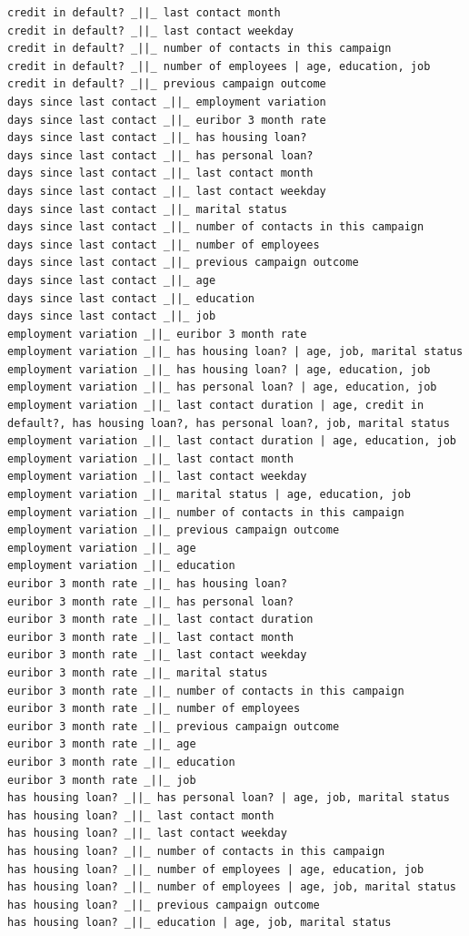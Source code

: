 \documentclass[11pt,]{article}
\begin{document}
{\begin{verbatim}
credit in default? _||_ last contact month
credit in default? _||_ last contact weekday
credit in default? _||_ number of contacts in this campaign
credit in default? _||_ number of employees | age, education, job
credit in default? _||_ previous campaign outcome
days since last contact _||_ employment variation
days since last contact _||_ euribor 3 month rate
days since last contact _||_ has housing loan?
days since last contact _||_ has personal loan?
days since last contact _||_ last contact month
days since last contact _||_ last contact weekday
days since last contact _||_ marital status
days since last contact _||_ number of contacts in this campaign
days since last contact _||_ number of employees
days since last contact _||_ previous campaign outcome
days since last contact _||_ age
days since last contact _||_ education
days since last contact _||_ job
employment variation _||_ euribor 3 month rate
employment variation _||_ has housing loan? | age, job, marital status
employment variation _||_ has housing loan? | age, education, job
employment variation _||_ has personal loan? | age, education, job
employment variation _||_ last contact duration | age, credit in default?, has housing loan?, has personal loan?, job, marital status
employment variation _||_ last contact duration | age, education, job
employment variation _||_ last contact month
employment variation _||_ last contact weekday
employment variation _||_ marital status | age, education, job
employment variation _||_ number of contacts in this campaign
employment variation _||_ previous campaign outcome
employment variation _||_ age
employment variation _||_ education
euribor 3 month rate _||_ has housing loan?
euribor 3 month rate _||_ has personal loan?
euribor 3 month rate _||_ last contact duration
euribor 3 month rate _||_ last contact month
euribor 3 month rate _||_ last contact weekday
euribor 3 month rate _||_ marital status
euribor 3 month rate _||_ number of contacts in this campaign
euribor 3 month rate _||_ number of employees
euribor 3 month rate _||_ previous campaign outcome
euribor 3 month rate _||_ age
euribor 3 month rate _||_ education
euribor 3 month rate _||_ job
has housing loan? _||_ has personal loan? | age, job, marital status
has housing loan? _||_ last contact month
has housing loan? _||_ last contact weekday
has housing loan? _||_ number of contacts in this campaign
has housing loan? _||_ number of employees | age, education, job
has housing loan? _||_ number of employees | age, job, marital status
has housing loan? _||_ previous campaign outcome
has housing loan? _||_ education | age, job, marital status

\end{verbatim}}
\end{document}
